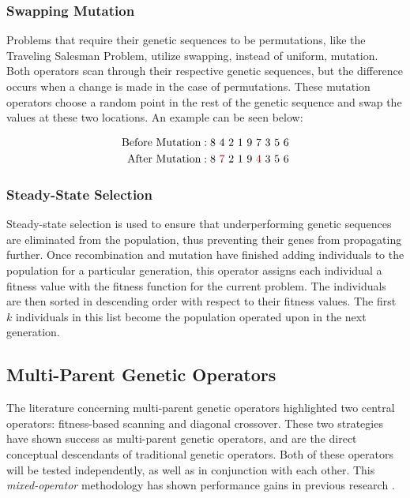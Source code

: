 \subsubsection*{Swapping Mutation}
Problems that require their genetic sequences to be permutations, like the Traveling Salesman Problem, utilize swapping, instead of uniform, mutation. Both operators scan through their respective genetic sequences, but the difference occurs when a change is made in the case of permutations. These mutation operators choose a random point in the rest of the genetic sequence and swap the values at these two locations. An example can be seen below:

\begin{align*}
\text{Before Mutation} &: 8~4~2~1~9~7~3~5~6 			\\
\text{After Mutation} &:  8~{\color{myred}7}~2~1~9~{\color{myred}4}~3~5~6		
\end{align*}

\subsubsection*{Steady-State Selection}
Steady-state selection is used to ensure that underperforming genetic sequences are eliminated from the population, thus preventing their genes from propagating further. Once recombination and mutation have finished adding individuals to the population for a particular generation, this operator assigns each individual a fitness value with the fitness function for the current problem. The individuals are then sorted in descending order with respect to their fitness values. The first $k$ individuals in this list become the population operated upon in the next generation.

\subsection*{Multi-Parent Genetic Operators}
The literature concerning multi-parent genetic operators highlighted two central operators: fitness-based scanning and diagonal crossover. These two strategies have shown success as multi-parent genetic operators, and are the direct conceptual descendants of traditional genetic operators. Both of these operators will be tested independently, as well as in conjunction with each other. This \emph{mixed-operator} methodology has shown performance gains in previous research \cite{Smith04}.

